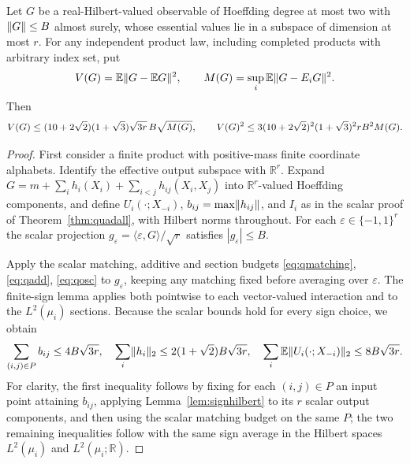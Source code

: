 \begin{theorem}\label{thm:rank-influence}
Let $G$ be a real-Hilbert-valued observable of Hoeffding degree at most two with $\lVert G\rVert\le B$ almost surely, whose essential values lie in a subspace of dimension at most $r$. For any independent product law, including completed products with arbitrary index set, put
\[
 V(G)=\mathbb E\lVert G-\mathbb E G\rVert^2,\qquad
 M(G)=\sup_i\mathbb E\lVert G-E_iG\rVert^2.
\]
Then
\begin{equation}\label{eq:vectorinfluence}
 V(G)\le(10+2\sqrt2)(1+\sqrt3)\sqrt{3r}\,B\sqrt{M(G)},\qquad
 V(G)^2\le3(10+2\sqrt2)^2(1+\sqrt3)^2 rB^2M(G).
\end{equation}
\end{theorem}
\begin{proof}
First consider a finite product with positive-mass finite coordinate alphabets. Identify the effective output subspace with $\mathbb R^r$. Expand
$G=m+\sum_i h_i(X_i)+\sum_{i<j}h_{ij}(X_i,X_j)$
into $\mathbb R^r$-valued Hoeffding components, and define $U_i(\cdot;X_{-i})$, $b_{ij}=\max\lVert h_{ij}\rVert$, and $I_i$ as in the scalar proof of Theorem~\ref{thm:quadall}, with Hilbert norms throughout. For each $\varepsilon\in\{-1,1\}^r$ the scalar projection
$g_\varepsilon=\langle\varepsilon,G\rangle/\sqrt r$ satisfies $|g_\varepsilon|\le B$.

Apply the scalar matching, additive and section budgets \eqref{eq:qmatching}, \eqref{eq:qadd}, \eqref{eq:qosc} to $g_\varepsilon$, keeping any matching fixed before averaging over $\varepsilon$. The finite-sign lemma applies both pointwise to each vector-valued interaction and to the $L^2(\mu_i)$ sections. Because the scalar bounds hold for every sign choice, we obtain
\begin{equation}\label{eq:vectorbudgets}
 \sum_{(i,j)\in P}b_{ij}\le4B\sqrt{3r},\quad
 \sum_i\lVert h_i\rVert_2\le2(1+\sqrt2) B\sqrt{3r},\quad
 \sum_i\mathbb E\lVert U_i(\cdot;X_{-i})\rVert_2\le8B\sqrt{3r}.
\end{equation}
For clarity, the first inequality follows by fixing for each $(i,j)\in P$ an input point attaining $b_{ij}$, applying Lemma~\ref{lem:signhilbert} to its $r$ scalar output components, and then using the scalar matching budget on the same $P$; the two remaining inequalities follow with the same sign average in the Hilbert spaces $L^2(\mu_i)$ and $L^2(\mu_i;\mathbb R)$.


\end{proof}
